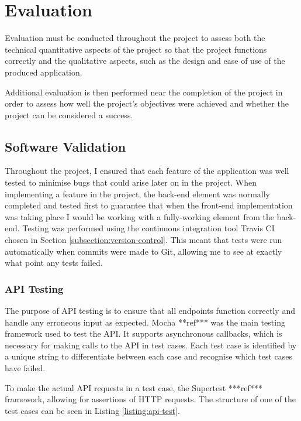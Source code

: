 \chapter{Evaluation}

Evaluation must be conducted throughout the project to assess both the technical quantitative aspects of the project so that the project functions correctly and the qualitative aspects, such as the design and ease of use of the produced application.

Additional evaluation is then performed near the completion of the project in order to assess how well the project's objectives were achieved and whether the project can be considered a success.

\section{Software Validation}

Throughout the project, I ensured that each feature of the application was well tested to minimise bugs that could arise later on in the project. When implementing a feature in the project, the back-end element was normally completed and tested first to guarantee that when the front-end implementation was taking place I would be working with a fully-working element from the back-end. Testing was performed using the continuous integration tool Travis CI chosen in Section \ref{subsection:version-control}. This meant that tests were run automatically when commits were made to Git, allowing me to see at exactly what point any tests failed.

\subsection{API Testing}

The purpose of API testing is to ensure that all endpoints function correctly and handle any erroneous input as expected. Mocha **ref*** was the main testing framework used to test the API. It supports asynchronous callbacks, which is necessary for making calls to the API in test cases. Each test case is identified by a unique string to differentiate between each case and recognise which test cases have failed.

To make the actual API requests in a test case, the Supertest ***ref*** framework, allowing for assertions of HTTP requests. The structure of one of the test cases can be seen in Listing \ref{listing:api-test}.


